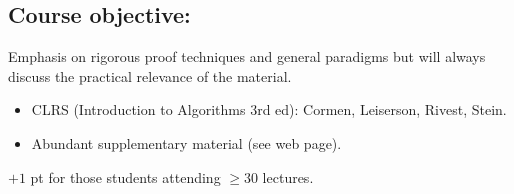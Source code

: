 \subsection{Course objective:} Emphasis on rigorous proof techniques and general paradigms but will always discuss the practical relevance of the material.
\begin{itemize}
\item CLRS (Introduction to Algorithms 3rd ed): Cormen, Leiserson, Rivest, Stein.
\item Abundant supplementary material (see web page).
\end{itemize}
$+1$ pt for those students attending $\geq 30$ lectures.
